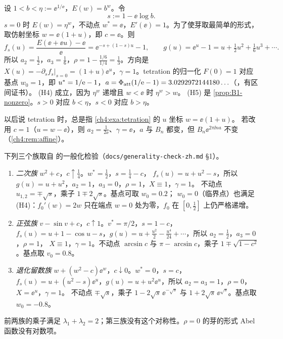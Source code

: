 \begin{example}[tetration]\label{ch4:exa:tetration}
设 $1<b<\eta:=\ee^{1/\ee}$，$E(w)=b^w$。令
\[
 s:=1-\ee\log b .
\]
$s=0$ 时 $E(w)=\eta^w$，不动点 $w^*=\ee$，$E'(\ee)=1$。为了使芽取最简单的形式，取仿射坐标 $w=\ee(1+u)$，即 $c=\ee$。则
\[
 f_s(u)=\frac{E(\ee+\ee u)-\ee}{\ee}=\ee^{-s+(1-s)u}-1,\qquad g(u)=\ee^u-1=u+\tfrac12u^2+\tfrac16u^3+\cdots .
\]
所以 $a_2=\tfrac12$，$a_3=\tfrac16$，$\rho=1-\tfrac{1/6}{1/4}=\tfrac13$。方向是
$X(u)=-\partial_sf_s|_{s=0}=(1+u)\ee^u$，$\gamma=1$。tetration 的归一化 $F(0)=1$ 对应基点
$w_0=1$，即 $u^{*}=1/\mathrm{e}-1$，$a=\Phi_{\mathrm{att}}(1/\mathrm{e}-1)=3.0292972144180\ldots$（\cite{KneserPaper}，有区间证书）。
(H4) 成立，因为 $\eta^w$ 递增且 $w<\ee$ 时 $\eta^w>w$。
(H5) 是 \cref{prop:B1-nonzero}。$s>0$ 对应 $b<\eta$，$s<0$ 对应 $b>\eta$。
\end{example}

以后说 tetration 时，总是指 \cref{ch4:exa:tetration} 的 $u$ 坐标 $w=\ee(1+u)$。
若改用 $c=1$（$u=w-\ee$），则 $a_2=\frac1{2\ee}$、$\gamma=\ee$，$a$ 与 $B_n$ 都变，但 $B_n\ee^{2\pi\ii na}$ 不变（\cref{ch4:rem:affine}）。

\begin{example}[另外三个族]\label{ch4:exa:families}
下列三个族取自 \cite{KneserPaper} 的一般化检验（\texttt{docs/generality-check-zh.md} §1）。
\begin{enumerate}
\item \emph{二次族} $w^2+c$，$c\uparrow\frac14$。$w^*=\frac12$，$s=\frac14-c$，
  $f_s(u)=u+u^2-s$，所以 $g(u)=u+u^2$，$a_2=1$，$a_3=0$，$\rho=1$，$X\equiv1$，$\gamma=1$。
  不动点 $u_{1,2}=\mp\sqrt s$，乘子 $1\mp2\sqrt s$。基点可取 $w_0=0.2$；
  $w_0=0$（临界点）也满足 (H4)：$f_0'(w)=2w$ 只在端点 $w=0$ 处为零，$f_0$ 在 $[0,\frac12]$ 上仍严格递增。
\item \emph{正弦族} $v-\sin v+c$，$c\uparrow1$。$v^*=\pi/2$，$s=1-c$，
  $f_s(u)=u+1-\cos u-s$，$g(u)=u+\frac{u^2}2-\frac{u^4}{24}+\cdots$，所以 $a_2=\frac12$，$a_3=0$，$\rho=1$，
  $X\equiv1$，$\gamma=1$。不动点 $\arcsin c$ 与 $\pi-\arcsin c$，乘子 $1\mp\sqrt{1-c^2}$。基点取 $v_0=0.8$。
\item \emph{退化留数族} $w+(w^2-c)\ee^w$，$c\downarrow0$。$w^*=0$，$s=c$，
  $f_s(u)=u+(u^2-s)\ee^u$，$g(u)=u+u^2\ee^u$，所以 $a_2=a_3=1$，$\rho=0$，$X=\ee^u$，$\gamma=1$。
  不动点 $\mp\sqrt s$，乘子 $1-2\sqrt s\,\ee^{-\sqrt s}$ 与 $1+2\sqrt s\,\ee^{\sqrt s}$。基点取 $w_0=-0.8$。
\end{enumerate}
前两族的乘子满足 $\lambda_1+\lambda_2=2$；第三族没有这个对称性。$\rho=0$ 的芽的形式 Abel 函数没有对数项。
\end{example}


